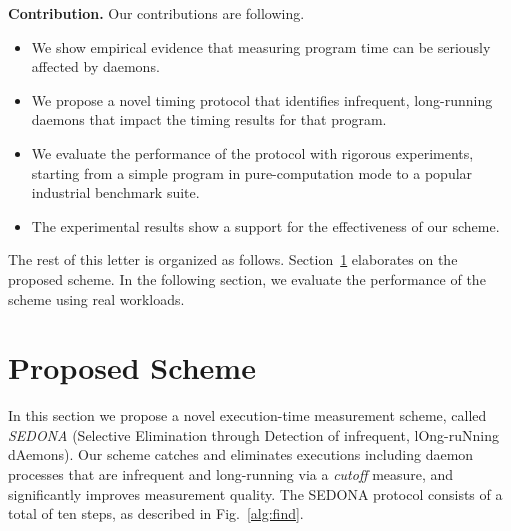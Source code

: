 \documentclass[letter]{ieice}
\begin{document}
{\bf Contribution.} 
Our contributions are following.
\vspace{-0.12in}
\begin{itemize}

\item We show empirical evidence that 
measuring program time 
can be seriously affected by daemons.

\item We propose a novel timing protocol that
identifies infrequent, long-running daemons that impact the timing results for that program. 

\item We evaluate the performance of the protocol with rigorous experiments, 
starting from a simple program in pure-computation mode 
to a popular industrial benchmark suite.

\item The experimental results show a support for the effectiveness of our scheme. 

\end{itemize}
\vspace{-0.05in}

\noindent
The rest of this letter is organized as follows. 
Section~\ref{sec:prop_appach} elaborates on the proposed scheme. 
In the following section, we evaluate the performance of 
the scheme using real workloads.


\section{Proposed Scheme}
\label{sec:prop_appach}

In this section we propose a novel execution-time measurement scheme, 
called {\em SEDONA} (Selective Elimination through Detection of infrequent, lOng-ruNning dAemons). 
Our scheme catches and eliminates executions including daemon processes that are infrequent and 
long-running via a {\em cutoff} measure, and significantly improves measurement quality. 
The SEDONA protocol consists of a total of ten steps, as described in Fig.~\ref{alg:find}. 
\end{document}
